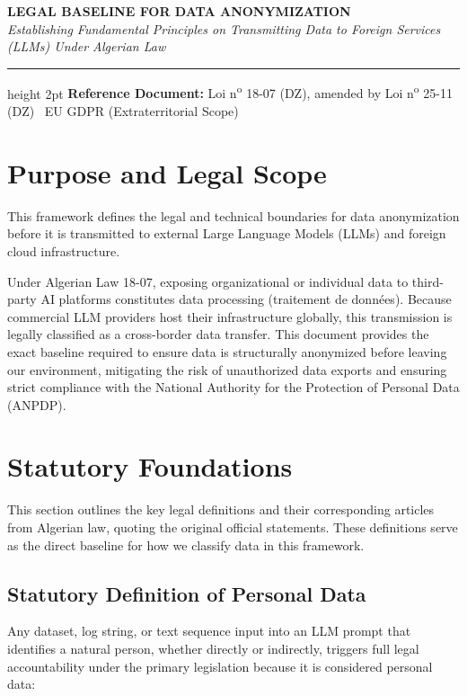 \documentclass[11pt,a4paper]{article}
\begin{document}
\begin{center}
    {\large\bfseries \MakeUppercase{Legal Baseline for Data Anonymization}} \\[4pt]
    {\itshape Establishing Fundamental Principles on Transmitting Data to Foreign Services (LLMs) Under Algerian Law} \\[12pt]
    \hrule height 2pt
    \vspace{6pt}
    {\footnotesize \textbf{Reference Document:} Loi n\textsuperscript{o} 18-07 (DZ), amended by Loi n\textsuperscript{o} 25-11 (DZ) \textbar\ EU GDPR (Extraterritorial Scope)}
    \vspace{10pt}
\end{center}

\section{Purpose and Legal Scope}
This framework defines the legal and technical boundaries for data anonymization before it is transmitted to external Large Language Models (LLMs) and foreign cloud infrastructure.

Under Algerian Law 18-07, exposing organizational or individual data to third-party AI platforms constitutes data processing (traitement de données). Because commercial LLM providers host their infrastructure globally, this transmission is legally classified as a cross-border data transfer. This document provides the exact baseline required to ensure data is structurally anonymized before leaving our environment, mitigating the risk of unauthorized data exports and ensuring strict compliance with the National Authority for the Protection of Personal Data (ANPDP).

\section{Statutory Foundations}
This section outlines the key legal definitions and their corresponding articles from Algerian law, quoting the original official statements. These definitions serve as the direct baseline for how we classify data in this framework.

\subsection{Statutory Definition of Personal Data}
Any dataset, log string, or text sequence input into an LLM prompt that identifies a natural person, whether directly or indirectly, triggers full legal accountability under the primary legislation because it is considered personal data:
\end{document}
